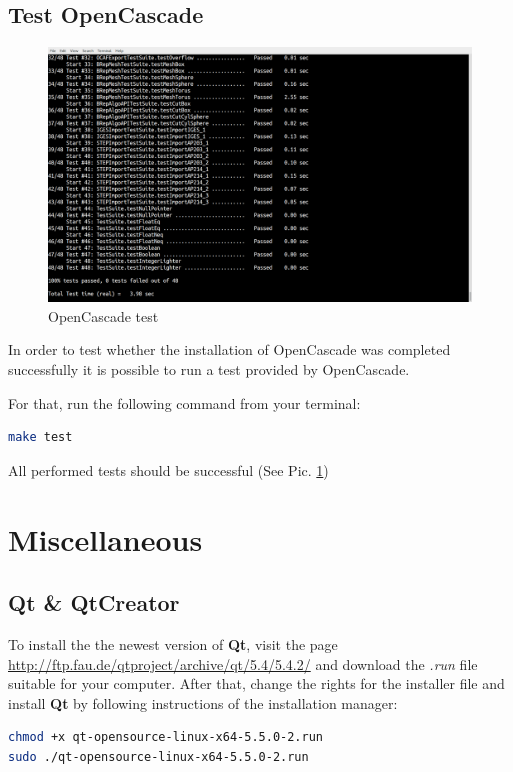 \documentclass[11pt,a4paper,article,bibtotoc,idxtotoc,headsepline,footsepline,footexclude,DIV13,oneside]{scrbook}
\begin{document}
\section{Test OpenCascade}
\begin{figure}
\centering
\includegraphics[scale=0.2]{img/OC_Test2.png}
\caption{OpenCascade test}
\label{fig:OC_test}
\end{figure}
In order to test whether the installation of OpenCascade was completed successfully it is possible to run a test provided by OpenCascade. 

For that, run the following command from your terminal:
\begin{lstlisting}[language=bash]
make test
\end{lstlisting}
All performed tests should be successful (See Pic. \ref{fig:OC_test})

\chapter{Miscellaneous}
\section{Qt \& QtCreator}
\label{Qt}
To install the the newest version of \textbf{Qt}, visit the page \\ \href{http://ftp.fau.de/qtproject/archive/qt/5.4/5.4.2/}{http://ftp.fau.de/qtproject/archive/qt/5.4/5.4.2/} and download the \textit{.run} file suitable for your computer. 
After that, change the rights for the installer file and install \textbf{Qt} by following instructions of the installation manager:
\begin{lstlisting}[language=bash]
chmod +x qt-opensource-linux-x64-5.5.0-2.run
sudo ./qt-opensource-linux-x64-5.5.0-2.run
\end{lstlisting}
\end{document}

